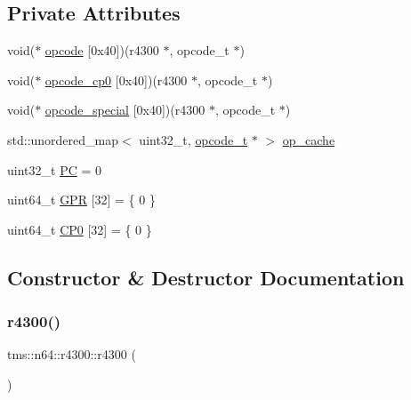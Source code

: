 \subsection*{Private Attributes}
\begin{DoxyCompactItemize}
\item 
void($\ast$ \hyperlink{classtms_1_1n64_1_1r4300_a9217421274555f8be02ac38f6387e1c7}{opcode} \mbox{[}0x40\mbox{]})(r4300 $\ast$, opcode\+\_\+t $\ast$)
\item 
void($\ast$ \hyperlink{classtms_1_1n64_1_1r4300_af46bb963380ecc423152c6a73fa2bb35}{opcode\+\_\+cp0} \mbox{[}0x40\mbox{]})(r4300 $\ast$, opcode\+\_\+t $\ast$)
\item 
void($\ast$ \hyperlink{classtms_1_1n64_1_1r4300_a0726d158c0880585ead0c74bcacedbc5}{opcode\+\_\+special} \mbox{[}0x40\mbox{]})(r4300 $\ast$, opcode\+\_\+t $\ast$)
\item 
std\+::unordered\+\_\+map$<$ uint32\+\_\+t, \hyperlink{classtms_1_1n64_1_1opcode__t}{opcode\+\_\+t} $\ast$ $>$ \hyperlink{classtms_1_1n64_1_1r4300_ac82d086480b02eb3bc52922946d284c8}{op\+\_\+cache}
\item 
uint32\+\_\+t \hyperlink{classtms_1_1n64_1_1r4300_aa173e660cb889b933ed965b6d263e3dd}{PC} = 0
\item 
uint64\+\_\+t \hyperlink{classtms_1_1n64_1_1r4300_a7490979b45ea2a9079ddc7513f78f907}{G\+PR} \mbox{[}32\mbox{]} = \{ 0 \}
\item 
uint64\+\_\+t \hyperlink{classtms_1_1n64_1_1r4300_a95c65bd068adb9212d1a22ac5825064e}{C\+P0} \mbox{[}32\mbox{]} = \{ 0 \}
\end{DoxyCompactItemize}


\subsection{Constructor \& Destructor Documentation}
\mbox{\label{classtms_1_1n64_1_1r4300_a39ac7ecb973328f1cae8dbb9d9ec4dd1}} 
\subsubsection{\texorpdfstring{r4300()}{r4300()}}
{\footnotesize\ttfamily tms\+::n64\+::r4300\+::r4300 (\begin{DoxyParamCaption}{ }\end{DoxyParamCaption})}

